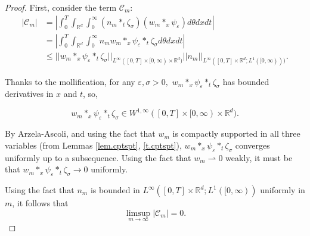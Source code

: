 \documentclass{amsart}
\def\R{\mathbb R}
\begin{document}
\begin{proof}
 First, consider the term $\mathcal{C}_m:$ 
 \begin{align*}
    |\mathcal{C}_m|&= |\int_{0}^{T}\int_{\R^d}\int_{0}^{\infty}(n_m *_t \zeta_\sigma)(w_m *_x\psi_\varepsilon)d\theta dx dt|\\&=|\int_{0}^{T}\int_{\R^d}\int_{0}^{\infty}n_m w_m *_x \psi_\varepsilon *_t \zeta_\sigma d\theta dx dt| \\
     & \leq ||w_m *_x \psi_\varepsilon *_t \zeta_\sigma ||_{L^\infty([0,T]\times[0,\infty)\times\R^d)}||n_m||_{L^\infty([0,T]\times\R^d;L^1([0,\infty)))}.
 \end{align*}
 
 Thanks to the mollification, for any $\varepsilon, \sigma>0,$ $w_m *_x \psi_\varepsilon*_t \zeta_\sigma$ has bounded derivatives in $x$ and $t$, so,  

 $$
 w_m *_x \psi_\varepsilon*_t \zeta_\sigma \in W^{1,\infty}([0,T]\times[0,\infty)\times\R^d).
 $$

By Arzela-Ascoli, and using the fact that $w_m$ is compactly supported in all three variables (from Lemmas \ref{lem.cptspt}, \ref{t.cptspt}), $w_m *_x \psi_\varepsilon*_t \zeta_\sigma$ converges  uniformly up to a subsequence. Using the fact that $w_m \rightharpoonup 0$ weakly, it must be that $w_m *_x \psi_\varepsilon *_t \zeta_\sigma \rightarrow 0$ uniformly.   

Using the fact that $n_m$ is bounded in $L^\infty([0,T]\times \R^d ;L^1([0,\infty))$ uniformly in $m$, it follows that
$$
\limsup_{m\rightarrow \infty}|\mathcal{C}_m|=0.
$$



\end{proof}
\end{document}
